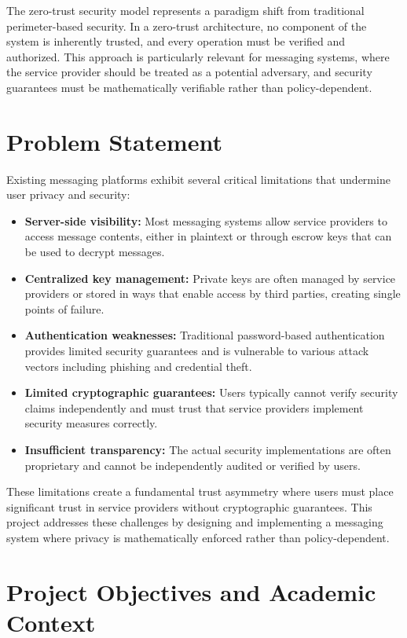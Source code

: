\documentclass[12pt,a4paper,openany]{book}
\begin{document}
The zero-trust security model \cite{zero-trust} represents a paradigm shift from traditional perimeter-based security. In a zero-trust architecture, no component of the system is inherently trusted, and every operation must be verified and authorized. This approach is particularly relevant for messaging systems, where the service provider should be treated as a potential adversary, and security guarantees must be mathematically verifiable rather than policy-dependent.

\section{Problem Statement}

Existing messaging platforms exhibit several critical limitations that undermine user privacy and security:

\begin{itemize}
\item \textbf{Server-side visibility:} Most messaging systems allow service providers to access message contents, either in plaintext or through escrow keys that can be used to decrypt messages.
\item \textbf{Centralized key management:} Private keys are often managed by service providers or stored in ways that enable access by third parties, creating single points of failure.
\item \textbf{Authentication weaknesses:} Traditional password-based authentication provides limited security guarantees and is vulnerable to various attack vectors including phishing and credential theft.
\item \textbf{Limited cryptographic guarantees:} Users typically cannot verify security claims independently and must trust that service providers implement security measures correctly.
\item \textbf{Insufficient transparency:} The actual security implementations are often proprietary and cannot be independently audited or verified by users.
\end{itemize}

These limitations create a fundamental trust asymmetry where users must place significant trust in service providers without cryptographic guarantees. This project addresses these challenges by designing and implementing a messaging system where privacy is mathematically enforced rather than policy-dependent.

\section{Project Objectives and Academic Context}
\end{document}
